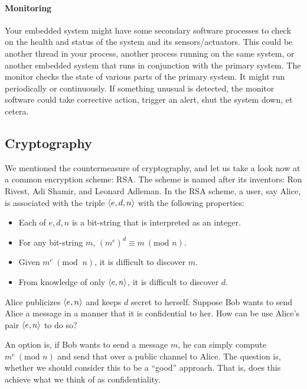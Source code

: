 \paragraph{Monitoring}
Your embedded system might have some secondary software processes to check on the health and status of the system and its sensors/actuators. This could be another thread in your process, another process running on the same system, or another embedded system that runs in conjunction with the primary system. The monitor checks the state of various parts of the primary system. It might run periodically or continuously. If something unusual is detected, the monitor software could take corrective action, trigger an alert, shut the system down, et cetera.

\subsection*{Cryptography}
We mentioned the countermeasure of cryptography, and let us take a look now at a common encryption scheme: RSA. The scheme is named after its inventors: Ron Rivest, Adi Shamir, and Leonard Adleman. In the RSA scheme, a user, say Alice, is associated with the
triple $\left\langle e, d, n \right\rangle$ with the following properties:
\begin{itemize}
    \item Each of $e, d, n$ is a bit-string that is interpreted as an integer.
    \item For any bit-string $m$, $\left(m^e\right)^d \equiv m~(\text{mod } n)$.
    \item Given $m^e~(\text{mod }~ n)$, it is difficult to discover $m$.
    \item From knowledge of only $\left\langle e, n \right\rangle$, it is difficult to discover $d$.
\end{itemize}

Alice publicizes $\left\langle e, n \right\rangle$ and keeps $d$ secret to herself.
Suppose Bob wants to send Alice a message in a manner that it is confidential
to her. How can be use Alice's pair $\left\langle e, n \right\rangle$ to do so?

An option is, if Bob wants to send a message $m$, he can simply compute
$m^e~(\text{mod } n)$ and send that over a public channel to Alice.
The question is, whether we should consider this to be a ``good'' approach.
That is, does this achieve what we think of as confidentiality.

